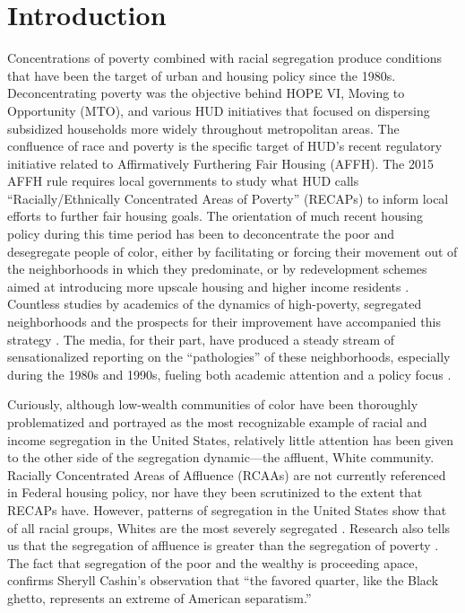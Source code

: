 \documentclass[11pt,]{article}
\begin{document}
\vskip 6.5pt


\noindent \doublespacing \hypertarget{introduction}{%
\section{Introduction}\label{introduction}}

Concentrations of poverty combined with racial segregation produce
conditions that have been the target of urban and housing policy since
the 1980s. Deconcentrating poverty was the objective behind HOPE VI,
Moving to Opportunity (MTO), and various HUD initiatives that focused on
dispersing subsidized households more widely throughout metropolitan
areas. The confluence of race and poverty is the specific target of
HUD's recent regulatory initiative related to Affirmatively Furthering
Fair Housing (AFFH). The 2015 AFFH rule requires local governments to
study what HUD calls ``Racially/Ethnically Concentrated Areas of
Poverty'' (RECAPs) to inform local efforts to further fair housing
goals. The orientation of much recent housing policy during this time
period has been to deconcentrate the poor and desegregate people of
color, either by facilitating or forcing their movement out of the
neighborhoods in which they predominate, or by redevelopment schemes
aimed at introducing more upscale housing and higher income residents
\autocite{goetzCtW2003}. Countless studies by academics of the dynamics
of high-poverty, segregated neighborhoods and the prospects for their
improvement have accompanied this strategy
\autocite{jargowsky1997poverty,sharkey2013}. The media, for their part,
have produced a steady stream of sensationalized reporting on the
``pathologies'' of these neighborhoods, especially during the 1980s and
1990s, fueling both academic attention and a policy focus
\autocite{sharkey2013}.

Curiously, although low-wealth communities of color have been thoroughly
problematized and portrayed as the most recognizable example of racial
and income segregation in the United States, relatively little attention
has been given to the other side of the segregation dynamic---the
affluent, White community. Racially Concentrated Areas of Affluence
(RCAAs) are not currently referenced in Federal housing policy, nor have
they been scrutinized to the extent that RECAPs have. However, patterns
of segregation in the United States show that of all racial groups,
Whites are the most severely segregated \autocite{feagin2014}. Research
also tells us that the segregation of affluence is greater than the
segregation of poverty \autocite{feagin2014}. The fact that segregation
of the poor and the wealthy is proceeding apace, confirms Sheryll
Cashin's \autocite*[p.~185]{cashin2004failures} observation that ``the
favored quarter, like the Black ghetto, represents an extreme of
American separatism.''
\end{document}
